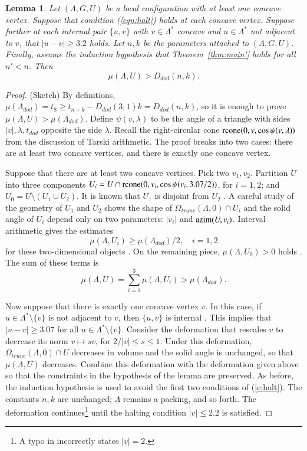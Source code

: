 \documentclass{article} %
\newtheorem{lemma}{Lemma}[subsection]
\begin{document}
\begin{lemma}\label{lemma:concave}  
Let $(\Lambda,G,U)$ be a local configuration with at least one
concave vertex.  Suppose that 
condition (\ref{eqn:halt}) holds at each concave vertex.  Suppose further at each internal
pair $\{u,v\}$ with $v\in\Lambda^*$ concave and $u\in\Lambda^*$ not adjacent to $v$,
that $|u-v|\ge 3.2$ holds.   Let $n,k$ be the parameters attached
to $(\Lambda,G,U)$.  Finally, assume the induction hypothesis that Theorem~\ref{thm:main'}
holds for all $n'<n$. Then
   $$\mu(\Lambda,U) > D_{dod}(n,k).$$
\end{lemma}

\begin{proof} (Sketch)  By definitions,
$\mu(\Lambda_{dod}) = t_8 \ge t_{n+k} - D_{dod}(3,1)k = D_{dod}(n,k)$, so it is
enough to prove $\mu(\Lambda,U) > \mu(\Lambda_{dod})$. 
Define $\psi(v,\lambda)$ to be the angle of a triangle with sides $|v|,\lambda,t_{dod}$
opposite the side $\lambda$.  Recall the right-circular cone 
${\operatorname{rcone}}(0,v,\cos\psi(v,\lambda))$ from the discussion of Tarski arithmetic.
The proof breaks into two
cases: there are at least two concave vertices, and there is exactly one concave vertex.

Suppose that there are at least two concave vertices.  Pick two $v_1,v_2$.
Partition $U$ into three
components $U_i = U\cap {\operatorname{rcone}}(0,v_i,\cos\psi(v_i,3.07/2))$, for $i=1,2$; and
$U_0= U\setminus (U_1\cup U_2)$.  It is known that
$U_1$ is disjoint from $U_2$ \cite[Lemma~3.7]{Hales:2002:Dodec}.   A careful study of the geometry
of $U_1$ and $U_2$ shows the shape of $\Omega_{trunc}(\Lambda,0)\cap U_i$ and the
solid angle of $U_i$ depend only
on two parameters: $|v_i|$ and ${\operatorname{azim}}(U,v_i)$.  Interval arithmetic gives
the estimates
  $$\mu(\Lambda,U_i) \ge \mu(\Lambda_{dod})/2,\quad i=1,2$$
for these two-dimensional objects \cite[\S7.2.6]{Hales:2002:Dodec}.  On the remaining piece, $\mu(\Lambda,U_0)>0$ holds
\cite[p.138]{Hales:2006:DCG}.  The sum of these terms is
  $$
  \mu(\Lambda,U) = \sum_{i=1}^3 \mu(\Lambda,U_i) > \mu(\Lambda_{dod}).
  $$

Now suppose that there is exactly one concave vertex $v$.  In this case, if $u\in\Lambda^*\setminus\{v\}$
is not adjacent to $v$, then $\{u,v\}$ is internal \cite[p.140]{Hales:2006:DCG}.  This implies
that $|u-v|\ge 3.07$ for all $u\in\Lambda^*\setminus\{v\}$.
Consider the deformation that rescales $v$ to decrease its norm $v\mapsto s v$, for 
$2/|v|\le s\le 1$. Under this deformation, $\Omega_{trunc}(\Lambda,0)\cap U$ decreases
in volume and the solid angle is unchanged, so that $\mu(\Lambda,U)$ decreases.
Combine this deformation with the deformation given above so that the
constraints in the hypothesis of the lemma are preserved.  As before, the induction
hypothesis is used to avoid the first two conditions of (\ref{e:halt}).
The constants $n,k$ are unchanged; $\Lambda$ remains a packing, and so forth.
The deformation continues\footnote{A typo in \cite{Hales:2002:Dodec}  incorrectly states $|v|=2$.} until the halting condition $|v|\le 2.2$ is satisfied. 


\end{proof}
\end{document}
